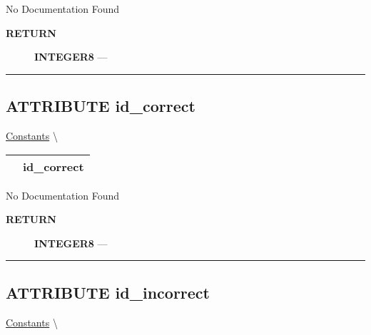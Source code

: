 No Documentation Found








\par
\begin{description}
\item [\colorbox{tagtype}{\color{white} \textbf{\textsf{RETURN}}}] \textbf{INTEGER8} --- 
\end{description}




\rule{\linewidth}{0.5pt}
\subsection*{\textsf{\colorbox{headtoc}{\color{white} ATTRIBUTE}
id\_correct}}

\hypertarget{ecldoc:constants.id_correct}{}
\hspace{0pt} \hyperlink{ecldoc:Constants}{Constants} \textbackslash 

{\renewcommand{\arraystretch}{1.5}
\begin{tabularx}{\textwidth}{|>{\raggedright\arraybackslash}l|X|}
\hline
\hspace{0pt}\mytexttt{\color{red} } & \textbf{id\_correct} \\
\hline
\end{tabularx}
}

\par





No Documentation Found








\par
\begin{description}
\item [\colorbox{tagtype}{\color{white} \textbf{\textsf{RETURN}}}] \textbf{INTEGER8} --- 
\end{description}




\rule{\linewidth}{0.5pt}
\subsection*{\textsf{\colorbox{headtoc}{\color{white} ATTRIBUTE}
id\_incorrect}}

\hypertarget{ecldoc:constants.id_incorrect}{}
\hspace{0pt} \hyperlink{ecldoc:Constants}{Constants} \textbackslash 

